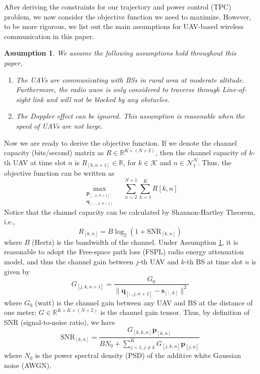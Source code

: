 \documentclass[10pt,final,conference]{IEEEtran}
\newtheorem{assumption}{\textbf{Assumption}}
\begin{document}
After deriving the constraints for our trajectory and power control (TPC) problem, we now consider the objective function we need to maximize. However, to be more rigorous, we list out the main assumptions for UAV-based wireless communication in this paper.
\begin{assumption}\label{assumpt1}
	We assume the following assumptions hold throughout this paper,
	\begin{enumerate}
		\item The UAVs are communicating with BSs in rural area at moderate altitude. Furthermore, the radio wave is only considered to traverse through Line-of-sight link and will not be blocked by any obstacles. 
		\item The Doppler effect can be ignored. This assumption is reasonable when the speed of UAVs are not large.
	\end{enumerate}
\end{assumption}
Now we are ready to derive the objective function. If we denote the channel capacity (bits/second) matrix as $R\in\mathbb{R}^{K\times (N+2)}$, then the channel capacity of $k$-th UAV at time slot $n$ is $R_{[k,n+1]}\in\mathbb{R}$, for $k\in\mathcal{K}$ and $n\in\mathcal{N}_1^N$. Thus, the objective function can be written as
\begin{equation}\label{Eq5}
\max_{\substack{\boldsymbol{p}_{[:,2:N+1]},\\ \boldsymbol{q}_{[:,:,2:N+1]}}}\quad\sum_{n=2}^{N+1}\sum_{k=1}^K R[k,n]
\end{equation}
Notice that the channel capacity can be calculated by Shannon-Hartley Theorem, i.e.,
\begin{equation}\label{Eq5.1}
R_{[k,n]} = B\log_2\left(1+\text{SNR}_{[k,n]}\right)\tag{5.1}
\end{equation}
where $B$ (Hertz) is the bandwidth of the channel. Under Assumption \ref{assumpt1}, it is reasonable to adopt the Free-space path loss (FSPL) radio energy attenuation model, and thus the channel gain between $j$-th UAV and $k$-th BS at time slot $n$ is given by
\begin{equation}\label{Eq5.2}
G_{[j,k,n+1]}=\frac{G_0}{\lVert\boldsymbol{q}_{[:,j,n+1]}-\boldsymbol{s}_{[:,k]}\rVert^2}\tag{5.2}
\end{equation}
where $G_0$ (watt) is the channel gain between any UAV and BS at the distance of one meter; $G\in\mathbb{R}^{K\times K\times (N+2)}$ is the channel gain tensor. Thus, by definition of SNR (signal-to-noise ratio), we have 
\begin{equation}\label{Eq5.3}
\text{SNR}_{[k,n]} = \frac{G_{[k,k,n]}\boldsymbol{p}_{[k,n]}}{BN_0+\sum_{j=1,j\ne k}^{K}G_{[j,k,n]}\boldsymbol{p}_{[j,n]}}\tag{5.3}
\end{equation}
where $N_0$ is the power spectral density (PSD) of the additive white Gaussian noise (AWGN).
\end{document}
